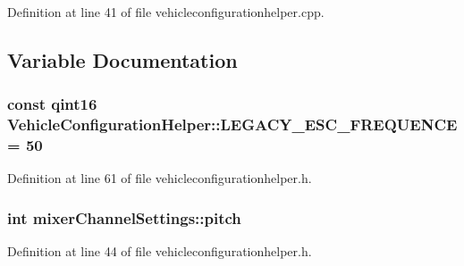 \-Definition at line 41 of file vehicleconfigurationhelper.\-cpp.



\subsection{\-Variable \-Documentation}
\hypertarget{group___vehicle_configuration_helper_ga1ab33357e7669d7825cadb88ff666f98}{
\subsubsection[{\-L\-E\-G\-A\-C\-Y\-\_\-\-E\-S\-C\-\_\-\-F\-R\-E\-Q\-U\-E\-N\-C\-E}]{\setlength{\rightskip}{0pt plus 5cm}const qint16 {\bf \-Vehicle\-Configuration\-Helper\-::\-L\-E\-G\-A\-C\-Y\-\_\-\-E\-S\-C\-\_\-\-F\-R\-E\-Q\-U\-E\-N\-C\-E} = 50}}\label{group___vehicle_configuration_helper_ga1ab33357e7669d7825cadb88ff666f98}


\-Definition at line 61 of file vehicleconfigurationhelper.\-h.

\hypertarget{group___vehicle_configuration_helper_gac604b2322be856866e658f6fba34c7f7}{
\subsubsection[{pitch}]{\setlength{\rightskip}{0pt plus 5cm}int {\bf mixer\-Channel\-Settings\-::pitch}}}\label{group___vehicle_configuration_helper_gac604b2322be856866e658f6fba34c7f7}


\-Definition at line 44 of file vehicleconfigurationhelper.\-h.

